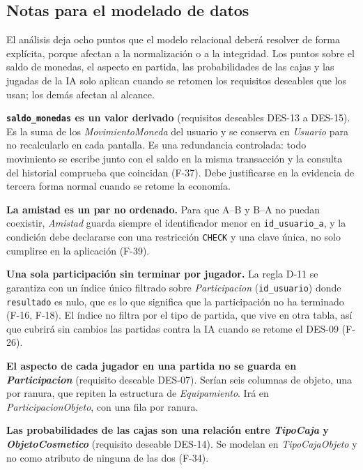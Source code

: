 \subsection*{Notas para el modelado de datos}

El análisis deja ocho puntos que el modelo relacional deberá resolver de forma explícita, porque afectan a la normalización o a la integridad. Los puntos sobre el saldo de monedas, el aspecto en partida, las probabilidades de las cajas y las jugadas de la IA solo aplican cuando se retomen los requisitos deseables que los usan; los demás afectan al alcance.

\begin{flujo}
  \item \textbf{\texttt{saldo\_\allowbreak{}monedas} es un valor derivado} (requisitos deseables \mbox{DES-13} a \mbox{DES-15}). Es la suma de los \textit{MovimientoMoneda} del usuario y se conserva en \textit{Usuario} para no recalcularlo en cada pantalla. Es una redundancia controlada: todo movimiento se escribe junto con el saldo en la misma transacción y la consulta del historial comprueba que coincidan (\mbox{F-37}). Debe justificarse en la evidencia de tercera forma normal cuando se retome la economía.
  \item \textbf{La amistad es un par no ordenado.} Para que A–B y B–A no puedan coexistir, \textit{Amistad} guarda siempre el identificador menor en \texttt{id\_\allowbreak{}usuario\_\allowbreak{}a}, y la condición debe declararse con una restricción \texttt{CHECK} y una clave única, no solo cumplirse en la aplicación (\mbox{F-39}).
  \item \textbf{Una sola participación sin terminar por jugador.} La regla \mbox{D-11} se garantiza con un índice único filtrado sobre \textit{Participacion} (\texttt{id\_\allowbreak{}usuario}) donde \texttt{resultado} es nulo, que es lo que significa que la participación no ha terminado (\mbox{F-16}, \mbox{F-18}). El índice no filtra por el tipo de partida, que vive en otra tabla, así que cubrirá sin cambios las partidas contra la IA cuando se retome el \mbox{DES-09} (\mbox{F-26}).
  \item \textbf{El aspecto de cada jugador en una partida no se guarda en \textit{Participacion}} (requisito deseable \mbox{DES-07}). Serían seis columnas de objeto, una por ranura, que repiten la estructura de \textit{Equipamiento}. Irá en \textit{ParticipacionObjeto}, con una fila por ranura.
  \item \textbf{Las probabilidades de las cajas son una relación entre \textit{TipoCaja} y \textit{ObjetoCosmetico}} (requisito deseable \mbox{DES-14}). Se modelan en \textit{TipoCajaObjeto} y no como atributo de ninguna de las dos (\mbox{F-34}).

\end{flujo}
